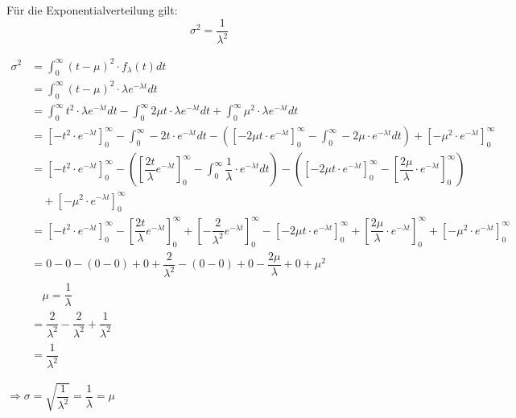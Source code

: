 \documentclass[main.tex]{subfiles}
\begin{document}
\begin{Theorem}[Varianz]
  Für die Exponentialverteilung gilt:
  $$ \sigma^2 = \dfrac{1}{\lambda^2}$$
\end{Theorem}

\begin{Beweis}
  \begin{align*}
    \sigma^2 
    & = \int_0^{\infty} (t-\mu)^2 \cdot f_\lambda (t)dt \\
    & = \int_0^{\infty} (t-\mu)^2 \cdot \lambda e^{-\lambda t} dt \\
    & = \int_0^{\infty} t^2 \cdot \lambda e^{-\lambda t} dt - \int_0^{\infty} 2\mu t \cdot \lambda e^{-\lambda t} dt + \int_0^{\infty} \mu^2 \cdot \lambda e^{-\lambda t} dt \\
    & = \left[ -t^2 \cdot e^{-\lambda t} \right]_0^\infty - \int_0^{\infty} -2t \cdot e^{-\lambda t} dt - \left(\left[-2\mu t \cdot e^{-\lambda t}\right]_0^\infty - \int_0^{\infty} -2\mu \cdot e^{-\lambda t} dt \right) + \left[-\mu^2 \cdot e^{-\lambda t}\right]_0^\infty \\
    & = \left[-t^2 \cdot e^{-\lambda t}\right]_0^\infty - \left(\left[ \dfrac{2t}{\lambda} e^{-\lambda t}\right]_0^\infty - \int_0^{\infty} \dfrac{1}{\lambda} \cdot e^{-\lambda t} dt\right) - \left(\left[-2\mu t \cdot e^{-\lambda t}\right]_0^\infty - \left[\dfrac{2\mu}{\lambda} \cdot e^{-\lambda t}\right]_0^\infty \right) \\
    & \quad + \left[-\mu^2 \cdot e^{-\lambda t}\right]_0^\infty \\
    & = \left[-t^2 \cdot e^{-\lambda t}\right]_0^\infty - \left[\dfrac{2t}{\lambda} e^{-\lambda t}\right]_0^\infty + \left[-\dfrac{2}{\lambda^2} e^{-\lambda t}\right]_0^\infty - \left[-2\mu t \cdot e^{-\lambda t}\right]_0^\infty + \left[\dfrac{2\mu}{\lambda} \cdot e^{-\lambda t}\right]_0^\infty + \left[-\mu^2 \cdot e^{-\lambda t}\right]_0^\infty \\
    & = 0 - 0 -(0 - 0) + 0 + \dfrac{2}{\lambda^2} - (0-0) + 0 - \dfrac{2\mu}{\lambda} + 0 + \mu^2 \qquad\qquad\qquad \\
    & \quad \mu = \dfrac{1}{\lambda} \\
    & = \dfrac{2}{\lambda^2} - \dfrac{2}{\lambda^2} + \dfrac{1}{\lambda^2} \\
    & = \dfrac{1}{\lambda^2}
  \end{align*}
\end{Beweis}

\begin{Bemerkung}
  $\Rightarrow \sigma = \sqrt{\dfrac{1}{\lambda^2}} = \dfrac{1}{\lambda} = \mu$
\end{Bemerkung}
\end{document}
